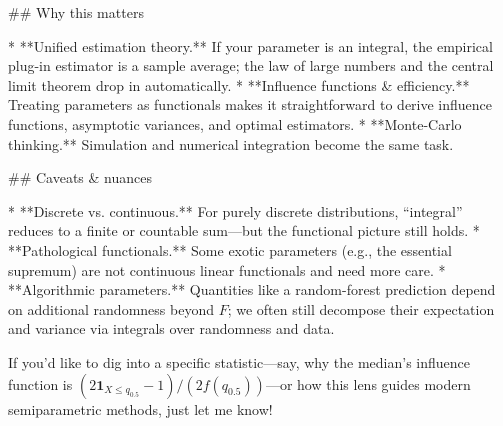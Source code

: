 ## Why this matters

* **Unified estimation theory.** If your parameter is an integral, the empirical plug-in estimator is a sample average; the law of large numbers and the central limit theorem drop in automatically.
* **Influence functions & efficiency.** Treating parameters as functionals makes it straightforward to derive influence functions, asymptotic variances, and optimal estimators.
* **Monte-Carlo thinking.** Simulation and numerical integration become the same task.

## Caveats & nuances

* **Discrete vs. continuous.** For purely discrete distributions, “integral” reduces to a finite or countable sum—but the functional picture still holds.
* **Pathological functionals.** Some exotic parameters (e.g., the essential supremum) are not continuous linear functionals and need more care.
* **Algorithmic parameters.** Quantities like a random-forest prediction depend on additional randomness beyond $F$; we often still decompose their expectation and variance via integrals over randomness and data.

If you’d like to dig into a specific statistic—say, why the median’s influence function is $ (2\mathbf1_{X\le q_{0.5}}-1)/(2f(q_{0.5}))$—or how this lens guides modern semiparametric methods, just let me know!
